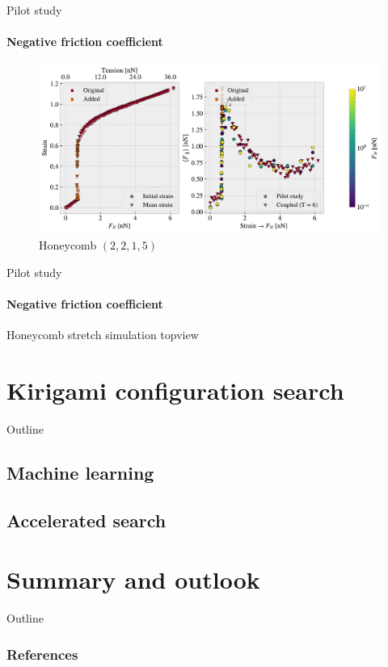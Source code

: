 \documentclass[
	10pt, %
]{beamer}
\begin{document}
\begin{frame}{Pilot study}
	\framesubtitle{Negative friction coefficient}

	\begin{figure}[H]
		\centering
		\includegraphics[width=\linewidth]{../thesis/figures/negative_coefficient/manual_coupling_tension_hon2215.pdf}	
	\caption{Honeycomb $(2,2,1,5)$}
	\end{figure}	
\end{frame}
%
%
\begin{frame}{Pilot study}
	\framesubtitle{Negative friction coefficient}
	Honeycomb stretch simulation topview
\end{frame}
%
%


\section{Kirigami configuration search} %
\begin{frame}{Outline}
    \tableofcontents[currentsection]
\end{frame}

\subsection{Machine learning}
\subsection{Accelerated search}



\section{Summary and outlook} %
\begin{frame}{Outline}
    \tableofcontents[currentsection]
\end{frame}




\begin{frame}%
	\frametitle{References}
	\printbibliography
\end{frame}
\end{document}
